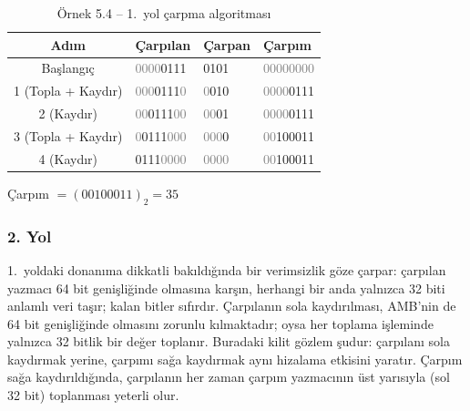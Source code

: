\begin{ornek}[5.4]
\begin{table}[H]
\centering
\caption{Örnek 5.4 -- 1.\ yol çarpma algoritması}
\label{tab:carpma1-ornek}
\small
\begin{tabular}{c l l l}
\toprule
\textbf{Adım} & \textbf{\textcolor{vurgumavi}{Çarpılan}} & \textbf{\textcolor{vurgukirmizi}{Çarpan}} & \textbf{\textcolor{vurguyesil}{Çarpım}} \\
\midrule
Başlangıç & \textcolor{gray}{0000}\textcolor{vurgumavi}{0111} & \textcolor{vurgukirmizi}{0101} & \textcolor{gray}{00000000} \\
1 (Topla + Kaydır) & \textcolor{gray}{000}\textcolor{vurgumavi}{0111}\textcolor{gray}{0} & \textcolor{gray}{0}\textcolor{vurgukirmizi}{010} & \textcolor{gray}{0000}\textcolor{vurguyesil}{0111} \\
2 (Kaydır) & \textcolor{gray}{00}\textcolor{vurgumavi}{0111}\textcolor{gray}{00} & \textcolor{gray}{00}\textcolor{vurgukirmizi}{01} & \textcolor{gray}{0000}\textcolor{vurguyesil}{0111} \\
3 (Topla + Kaydır) & \textcolor{gray}{0}\textcolor{vurgumavi}{0111}\textcolor{gray}{000} & \textcolor{gray}{000}\textcolor{vurgukirmizi}{0} & \textcolor{gray}{00}\textcolor{vurguyesil}{100011} \\
4 (Kaydır) & \textcolor{vurgumavi}{0111}\textcolor{gray}{0000} & \textcolor{gray}{0000} & \textcolor{gray}{00}\textcolor{vurguyesil}{100011} \\
\bottomrule
\end{tabular}
\end{table}

Çarpım $= (00100011)_2 = 35$
\end{ornek}

\subsubsection{2. Yol}

1.\ yoldaki donanıma dikkatli bakıldığında bir verimsizlik göze çarpar: çarpılan yazmacı 64 bit genişliğinde olmasına karşın, herhangi bir anda yalnızca 32 biti anlamlı veri taşır; kalan bitler sıfırdır. Çarpılanın sola kaydırılması, AMB'nin de 64 bit genişliğinde olmasını zorunlu kılmaktadır; oysa her toplama işleminde yalnızca 32 bitlik bir değer toplanır. Buradaki kilit gözlem şudur: çarpılanı sola kaydırmak yerine, çarpımı sağa kaydırmak aynı hizalama etkisini yaratır. Çarpım sağa kaydırıldığında, çarpılanın her zaman çarpım yazmacının üst yarısıyla (sol 32 bit) toplanması yeterli olur.

